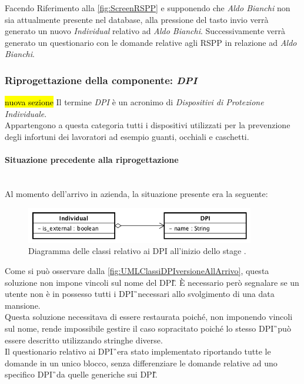 	Facendo Riferimento alla \autoref{fig:ScreenRSPP} e  supponendo che \textit{Aldo Bianchi} non sia attualmente presente nel database, alla pressione del tasto invio verrà generato un nuovo \textit{Individual} relativo ad \textit{Aldo Bianchi}. Successivamente verrà generato un questionario con le domande relative agli RSPP in relazione ad \textit{Aldo Bianchi}.
	
\newpage
\subsubsection{Riprogettazione della componente: \textit{DPI}}
\hl{nuova sezione}
Il termine \textit{DPI} è un acronimo di \textit{Dispositivi di Protezione Individuale}. \\
Appartengono a questa categoria tutti i dispositivi utilizzati per la prevenzione degli infortuni dei lavoratori ad esempio guanti, occhiali e caschetti.\\

\paragraph*{Situazione precedente alla riprogettazione} \mbox{} \\
Al momento dell'arrivo in azienda, la situazione presente era la seguente:
	\begin{figure}[H]
		\begin{center}
			\includegraphics[width=10cm]{Pics/UMLClassiDPIversioneAllArrivo.png}
			\caption{
			Diagramma delle classi relativo ai DPI all'inizio dello stage .}
			\label{fig:UMLClassiDPIversioneAllArrivo}
		\end{center}
	\end{figure}


Come si può osservare dalla \autoref{fig:UMLClassiDPIversioneAllArrivo}, questa soluzione non impone vincoli sul nome del \gls{DPI}\G.
È necessario però segnalare se un utente non è in possesso tutti i \gls{DPI}\G\ necessari allo svolgimento di una data mansione.\\
Questa soluzione necessitava di essere restaurata poiché, non imponendo vincoli sul nome, rende impossibile gestire il caso sopracitato poiché lo stesso \gls{DPI}\G\ può essere descritto utilizzando stringhe diverse.\\
Il questionario relativo ai \gls{DPI}\G\ era stato implementato riportando tutte le domande in un unico blocco, senza differenziare le domande relative ad uno specifico \gls{DPI}\G\ da quelle generiche sui \gls{DPI}\G.

